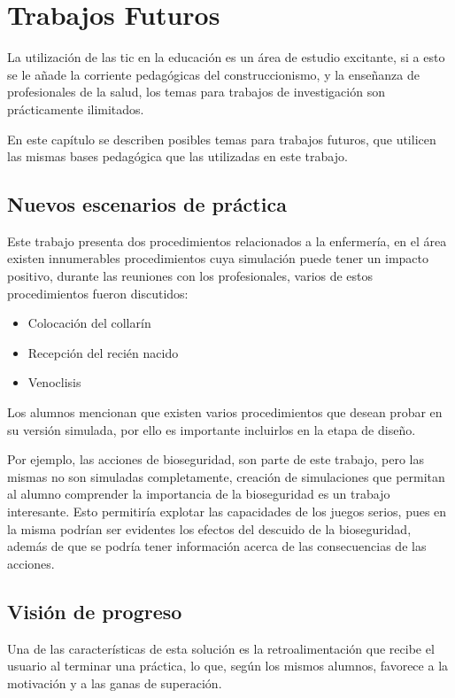 \chapter{Trabajos Futuros}
\label{chap:futuro}

La utilización de las \Gls{tic} en la educación es un área de estudio excitante,
si a esto se le añade la corriente pedagógicas del construccionismo, y la
enseñanza de profesionales de la salud, los temas para trabajos de investigación
son prácticamente ilimitados. 

En este capítulo se describen posibles temas para trabajos futuros, que utilicen
las mismas bases pedagógica que las utilizadas en este trabajo.

\section{Nuevos escenarios de práctica}

Este trabajo presenta dos procedimientos relacionados a la enfermería, en el
área existen innumerables procedimientos cuya simulación puede tener un impacto
positivo, durante las reuniones con los profesionales, varios de estos
procedimientos fueron discutidos:

\begin{itemize}
    \item Colocación del collarín
    \item Recepción del recién nacido
    \item Venoclisis
\end{itemize}

Los alumnos mencionan que existen varios procedimientos que desean probar en su
versión simulada, por ello es importante incluirlos en la etapa de diseño.

Por ejemplo, las acciones de bioseguridad, son parte de este trabajo, pero las
mismas no son simuladas completamente, creación de simulaciones que permitan al
alumno comprender la importancia de la bioseguridad es un trabajo interesante.
Esto permitiría explotar las capacidades de los juegos serios, pues en la misma
podrían ser evidentes los efectos del descuido de la bioseguridad, además de que
se podría tener información acerca de las consecuencias de las acciones.

\section{Visión de progreso}

Una de las características de esta solución es la retroalimentación que recibe
el usuario al terminar una práctica, lo que, según los mismos alumnos, favorece
a la motivación y a las ganas de superación.

